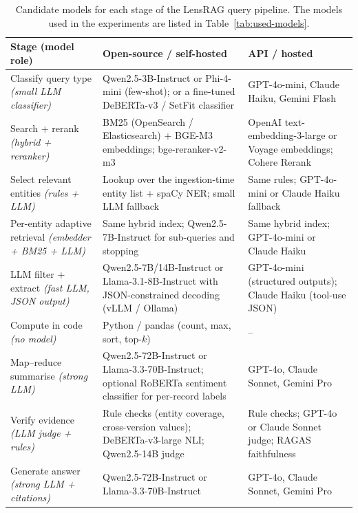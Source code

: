 \documentclass[11pt,letterpaper,oneside]{report}
\begin{document}
\begin{table}[htbp]
\centering\small
\caption{Candidate models for each stage of the LensRAG query pipeline.
The models used in the experiments are listed in Table~\ref{tab:used-models}.}
\label{tab:models}
\begin{tabularx}{\textwidth}{@{}>{\raggedright\arraybackslash}p{3.1cm} >{\raggedright\arraybackslash}X >{\raggedright\arraybackslash}X@{}}
\toprule
\textbf{Stage (model role)} & \textbf{Open-source / self-hosted} & \textbf{API / hosted} \\
\midrule
Classify query type \newline\emph{(small LLM classifier)} &
Qwen2.5-3B-Instruct or Phi-4-mini (few-shot); or a fine-tuned DeBERTa-v3 / SetFit classifier &
GPT-4o-mini, Claude Haiku, Gemini Flash \\ \addlinespace[4pt]
Search + rerank \newline\emph{(hybrid + reranker)} &
BM25 (OpenSearch / Elasticsearch) + BGE-M3 embeddings; bge-reranker-v2-m3 &
OpenAI text-embedding-3-large or Voyage embeddings; Cohere Rerank \\ \addlinespace[4pt]
Select relevant entities \newline\emph{(rules + LLM)} &
Lookup over the ingestion-time entity list + spaCy NER; small LLM fallback &
Same rules; GPT-4o-mini or Claude Haiku fallback \\ \addlinespace[4pt]
Per-entity adaptive retrieval \newline\emph{(embedder + BM25 + LLM)} &
Same hybrid index; Qwen2.5-7B-Instruct for sub-queries and stopping &
Same hybrid index; GPT-4o-mini or Claude Haiku \\ \addlinespace[4pt]
LLM filter + extract \newline\emph{(fast LLM, JSON output)} &
Qwen2.5-7B/14B-Instruct or Llama-3.1-8B-Instruct with JSON-constrained decoding (vLLM / Ollama) &
GPT-4o-mini (structured outputs); Claude Haiku (tool-use JSON) \\ \addlinespace[4pt]
Compute in code \newline\emph{(no model)} &
Python / pandas (count, max, sort, top-$k$) &
-- \\ \addlinespace[4pt]
Map--reduce summarise \newline\emph{(strong LLM)} &
Qwen2.5-72B-Instruct or Llama-3.3-70B-Instruct; optional RoBERTa sentiment classifier for per-record labels &
GPT-4o, Claude Sonnet, Gemini Pro \\ \addlinespace[4pt]
Verify evidence \newline\emph{(LLM judge + rules)} &
Rule checks (entity coverage, cross-version values); DeBERTa-v3-large NLI; Qwen2.5-14B judge &
Rule checks; GPT-4o or Claude Sonnet judge; RAGAS faithfulness \\ \addlinespace[4pt]
Generate answer \newline\emph{(strong LLM + citations)} &
Qwen2.5-72B-Instruct or Llama-3.3-70B-Instruct &
GPT-4o, Claude Sonnet, Gemini Pro \\
\bottomrule
\end{tabularx}
\end{table}
\end{document}
